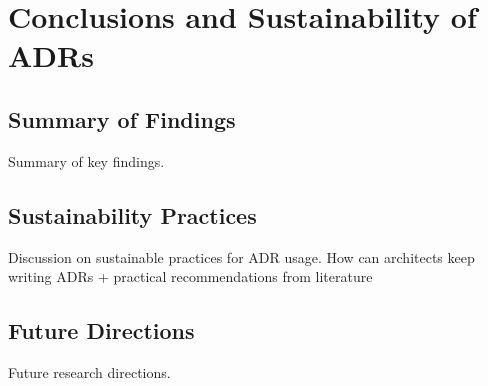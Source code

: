 \chapter{Conclusions and Sustainability of ADRs}
    \section{Summary of Findings}
        Summary of key findings.
    \section{Sustainability Practices}
        Discussion on sustainable practices for ADR usage. How can architects keep writing ADRs + practical recommendations from literature
    \section{Future Directions}
        Future research directions.
